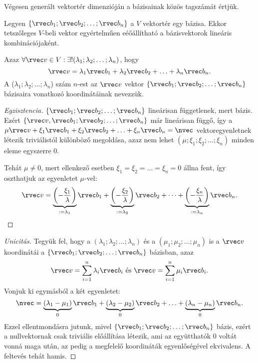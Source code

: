 \begin{definition}
  Végesen generált vektortér dimenzióján a bázisainak közös tagszámát értjük.
\end{definition}

\begin{statement}
  Legyen $\{ \rvec b_1; \rvec b_2; \dots; \rvec b_n \}$ a $V$ vektortér egy
  bázisa. Ekkor tetszőleges $V$-beli vektor egyértelműen eéőállítható a
  bázisvektorok lineáris kombinációjaként.

  Azaz $\forall \rvec v \in V: \exists! (\lambda_1; \lambda_2; \dots; \lambda_n)$,
  hogy
  $$
    \rvec v
    = \lambda_1 \rvec b_1
    + \lambda_2 \rvec b_2
    + \ldots
    + \lambda_n \rvec b_n
    \text.
  $$
  A ($\lambda_1; \lambda_2; \dots; \lambda_n$) szám $n$-est az $\rvec v$ vektor
  $\{ \rvec b_1; \rvec b_2; \dots; \rvec b_n \}$ bázisaira vonatkozó
  koordinátáinak nevezzük.

  \begin{proof}[Egzisztencia]
    $\{ \rvec b_1; \rvec b_2; \dots; \rvec b_n \}$ lineárisan
    függetlenek, mert bázis. Ezért $\{ \rvec v, \rvec b_1; \rvec b_2;
      \ldots; \rvec b_n \}$ már lineárisan függő, így a
    $
      \mu \rvec v + \xi_1 \rvec b_1 + \xi_2 \rvec b_2 + \ldots
      + \xi_n \rvec b_n = \nvec
    $
    vektoregyenletnek létezik triviálistól különböző megoldása, azaz nem
    lehet $(\mu; \xi_1; \xi_2; \ldots; \xi_n)$ minden eleme
    egyszerre 0.

    Tehát $\mu \neq 0$, mert ellenkező esetben $\xi_1 = \xi_2
      = \ldots = \xi_n = 0$ állna fent, így oszthatjuk az egyenletet
    $\mu$-vel:
    $$
      \rvec v
      = \underbrace{\left(-\frac{\xi_1}{\lambda}\right)}_{:= \lambda_1} \rvec b_1
      + \underbrace{\left(-\frac{\xi_2}{\lambda}\right)}_{:= \lambda_2} \rvec b_2
      + \dots
      + \underbrace{\left(-\frac{\xi_n}{\lambda}\right)}_{:= \lambda_n} \rvec b_n
      \text.
    $$
  \end{proof}

  \begin{proof}[Unicitás]
    Tegyük fel, hogy a $(\lambda_1; \lambda_2; \ldots; \lambda_n)$ és a
    $(\mu_1; \mu_2; \ldots; \mu_n)$ is a $\rvec v$
    koordinátái a $\{ \rvec b_1; \rvec b_2; \ldots; \rvec b_n \}$
    bázisban, azaz
    $$
      \rvec v = \sum_{i=1}^n \lambda_i \rvec b_i
      \text{ és }
      \rvec v = \sum_{i=1}^n \mu_i \rvec b_i
      \text.
    $$
    Vonjuk ki egymásból a két egyenletet:
    $$
      \nvec
      = \underbrace{(\lambda_1 - \mu_1)}_{0} \rvec b_1
      + \underbrace{(\lambda_2 - \mu_2)}_{0} \rvec b_2
      + \ldots
      + \underbrace{(\lambda_n - \mu_n)}_{0} \rvec b_n
      \text.
    $$
    Ezzel ellentmondásra jutunk, mivel $\{ \rvec b_1; \rvec b_2;
      \ldots; \rvec b_n \}$ bázis, ezért a nullvektornak csak triviális
    előállítása létezik, ami az együtthatók 0 voltát vonná maga után,
    az pedig a megfelelő koordináták egyenlőségével ekvivalens. A
    feltevés tehát hamis.
  \end{proof}
\end{statement}